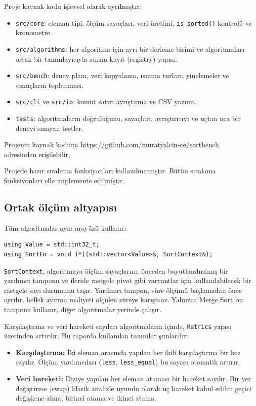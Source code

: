 \documentclass[12pt,a4paper]{article}
\begin{document}
Proje kaynak kodu işlevsel olarak ayrılmıştır:

\begin{itemize}
  \item \texttt{src/core}: eleman tipi, ölçüm sayaçları, veri üretimi,
        \texttt{is\_sorted()} kontrolü ve kronometre.
  \item \texttt{src/algorithms}: her algoritma için ayrı bir derleme birimi ve
        algoritmaları ortak bir tanımlayıcıyla sunan kayıt (registry) yapısı.
  \item \texttt{src/bench}: deney planı, veri kopyalama, ısınma turları,
        yinelemeler ve sonuçların toplanması.
  \item \texttt{src/cli} ve \texttt{src/io}: komut satırı ayrıştırma ve CSV
        yazımı.
  \item \texttt{tests}: algoritmaların doğruluğunu, sayaçları, ayrıştırıcıyı ve
        uçtan uca bir deneyi sınayan testler.
\end{itemize}

Projenin kaynak koduna
\url{https://github.com/muratyalcin-ce/sortbench} adresinden erişilebilir.

Projede hazır sıralama fonksiyonları kullanılmamıştır. Bütün sıralama
fonksiyonları elle implemente edilmiştir.

\subsection{Ortak ölçüm altyapısı}

Tüm algoritmalar aynı arayüzü kullanır:

\begin{verbatim}
using Value = std::int32_t;
using SortFn = void (*)(std::vector<Value>&, SortContext&);
\end{verbatim}

\texttt{SortContext}, algoritmaya ölçüm sayaçlarını, önceden boyutlandırılmış
bir yardımcı tamponu ve ileride rastgele pivot gibi varyantlar için
kullanılabilecek bir rastgele sayı durumunu taşır. Yardımcı tampon, süre ölçümü
başlamadan önce ayrılır, bellek ayırma maliyeti ölçülen süreye karışmaz.
Yalnızca Merge Sort bu tamponu kullanır, diğer algoritmalar yerinde çalışır.

Karşılaştırma ve veri hareketi sayıları algoritmaların içinde, \texttt{Metrics}
yapısı üzerinden artırılır. Bu raporda kullanılan tanımlar şunlardır:

\begin{itemize}
  \item \textbf{Karşılaştırma:} İki eleman arasında yapılan her ikili
        karşılaştırma bir kez sayılır. Ölçüm yardımcıları
        (\texttt{less}, \texttt{less\_equal}) bu sayacı otomatik artırır.
  \item \textbf{Veri hareketi:} Diziye yapılan her eleman ataması bir hareket
        sayılır. Bir yer değiştirme (swap) klasik analizle uyumlu olarak üç
        hareket kabul edilir: geçici değişkene alma, birinci atama ve ikinci
        atama.
\end{itemize}
\end{document}
